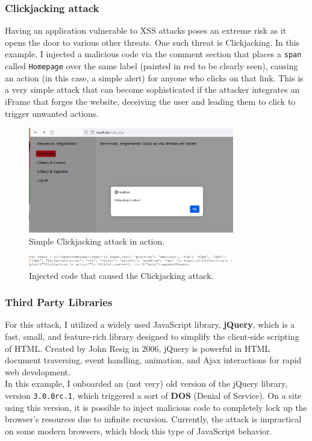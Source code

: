 \documentclass{article}
\begin{document}
\newpage

\subsubsection{Clickjacking attack}

Having an application vulnerable to XSS attacks poses an extreme risk as it opens the door to various other threats. One such threat is Clickjacking. In this example, I injected a malicious code via the comment section that places a \texttt{span} called \texttt{Homepage} over the same label (painted in red to be clearly seen), causing an action (in this case, a simple alert) for anyone who clicks on that link. This is a very simple attack that can become sophisticated if the attacker integrates an iFrame that forges the website, deceiving the user and leading them to click to trigger unwanted actions.

\begin{figure}[h]
\centering
\includegraphics[width=0.8\textwidth]{images/8.png}
\caption{Simple Clickjacking attack in action.}
\label{fig:clickjack}
\end{figure}

\begin{figure}[h]
\centering
\includegraphics[width=0.8\textwidth]{images/9.png}
\caption{Injected code that caused the Clickjacking attack.}
\label{fig:clickjack2}
\end{figure}

\subsubsection{Third Party Libraries}
For this attack, I utilized a widely used JavaScript library, \textbf{jQuery}, which is a fast, small, and feature-rich library designed to simplify the client-side scripting of HTML. Created by John Resig in 2006, jQuery is powerful in HTML document traversing, event handling, animation, and Ajax interactions for rapid web development.
\\
In this example, I onboarded an (not very) old version of the jQuery library, version \texttt{3.0.0\-rc.1}, which triggered a sort of \textbf{DOS} (Denial of Service). On a site using this version, it is possible to inject malicious code to completely lock up the browser's resources due to infinite recursion. Currently, the attack is impractical on some modern browsers, which block this type of JavaScript behavior.
\end{document}
